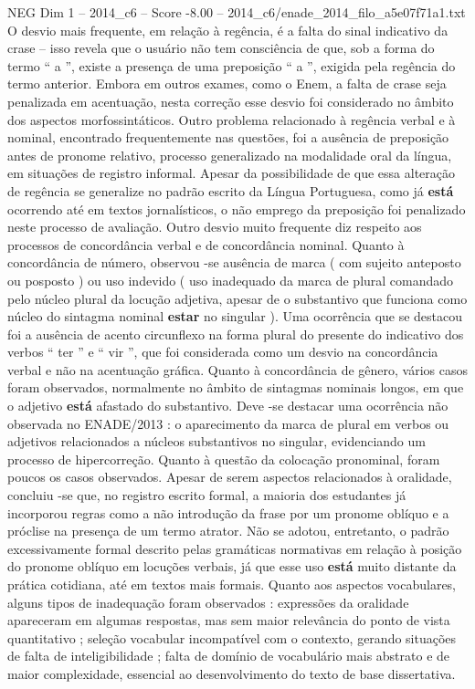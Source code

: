\begin{textsample}{NEG Dim 1 – 2014\_c6 – Score -8.00 – 2014\_c6/enade\_2014\_filo\_a5e07f71a1.txt}
O desvio mais frequente, em relação à regência, é a falta do sinal indicativo da crase – isso revela que o usuário não tem consciência de que, sob a forma do termo “ a ”, existe a presença de uma preposição “ a ”, exigida pela regência do termo anterior.
Embora em outros exames, como o Enem, a falta de crase seja penalizada em acentuação, nesta correção esse desvio foi considerado no âmbito dos aspectos morfossintáticos.
Outro problema relacionado à regência verbal e à nominal, encontrado frequentemente nas questões, foi a ausência de preposição antes de pronome relativo, processo generalizado na modalidade oral da língua, em situações de registro informal.
Apesar da possibilidade de que essa alteração de regência se generalize no padrão escrito da Língua Portuguesa, como já \textbf{está} ocorrendo até em textos jornalísticos, o não emprego da preposição foi penalizado neste processo de avaliação.
Outro desvio muito frequente diz respeito aos processos de concordância verbal e de concordância nominal.
Quanto à concordância de número, observou -se ausência de marca ( com sujeito anteposto ou posposto ) ou uso indevido ( uso inadequado da marca de plural comandado pelo núcleo plural da locução adjetiva, apesar de o substantivo que funciona como núcleo do sintagma nominal \textbf{estar} no singular ).
Uma ocorrência que se destacou foi a ausência de acento circunflexo na forma plural do presente do indicativo dos verbos “ ter ” e “ vir ”, que foi considerada como um desvio na concordância verbal e não na acentuação gráfica.
Quanto à concordância de gênero, vários casos foram observados, normalmente no âmbito de sintagmas nominais longos, em que o adjetivo \textbf{está} afastado do substantivo.
Deve -se destacar uma ocorrência não observada no ENADE/2013 : o aparecimento da marca de plural em verbos ou adjetivos relacionados a núcleos substantivos no singular, evidenciando um processo de hipercorreção.
Quanto à questão da colocação pronominal, foram poucos os casos observados.
Apesar de serem aspectos relacionados à oralidade, concluiu -se que, no registro escrito formal, a maioria dos estudantes já incorporou regras como a não introdução da frase por um pronome oblíquo e a próclise na presença de um termo atrator.
Não se adotou, entretanto, o padrão excessivamente formal descrito pelas gramáticas normativas em relação à posição do pronome oblíquo em locuções verbais, já que esse uso \textbf{está} muito distante da prática cotidiana, até em textos mais formais.
Quanto aos aspectos vocabulares, alguns tipos de inadequação foram observados : expressões da oralidade apareceram em algumas respostas, mas sem maior relevância do ponto de vista quantitativo ; seleção vocabular incompatível com o contexto, gerando situações de falta de inteligibilidade ; falta de domínio de vocabulário mais abstrato e de maior complexidade, essencial ao desenvolvimento do texto de base dissertativa.

\end{textsample}
